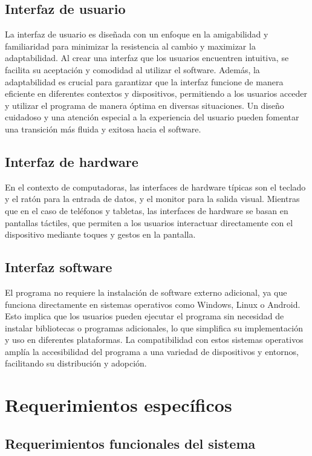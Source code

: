 \subsection{Interfaz de usuario}
La interfaz de usuario es diseñada con un enfoque en la amigabilidad y familiaridad para minimizar la resistencia al cambio y maximizar la adaptabilidad. Al crear una interfaz que los usuarios encuentren intuitiva, se facilita su aceptación y comodidad al utilizar el software. Además, la adaptabilidad es crucial para garantizar que la interfaz funcione de manera eficiente en diferentes contextos y dispositivos, permitiendo a los usuarios acceder y utilizar el programa de manera óptima en diversas situaciones. Un diseño cuidadoso y una atención especial a la experiencia del usuario pueden fomentar una transición más fluida y exitosa hacia el software.
\subsection{Interfaz de hardware}
En el contexto de computadoras, las interfaces de hardware típicas son el teclado y el ratón para la entrada de datos, y el monitor para la salida visual. Mientras que en el caso de teléfonos y tabletas, las interfaces de hardware se basan en pantallas táctiles, que permiten a los usuarios interactuar directamente con el dispositivo mediante toques y gestos en la pantalla.
\subsection{Interfaz software}
El programa no requiere la instalación de software externo adicional, ya que funciona directamente en sistemas operativos como Windows, Linux o Android. Esto implica que los usuarios pueden ejecutar el programa sin necesidad de instalar bibliotecas o programas adicionales, lo que simplifica su implementación y uso en diferentes plataformas. La compatibilidad con estos sistemas operativos amplía la accesibilidad del programa a una variedad de dispositivos y entornos, facilitando su distribución y adopción.
\section{Requerimientos específicos}

\subsection{Requerimientos funcionales del sistema}

